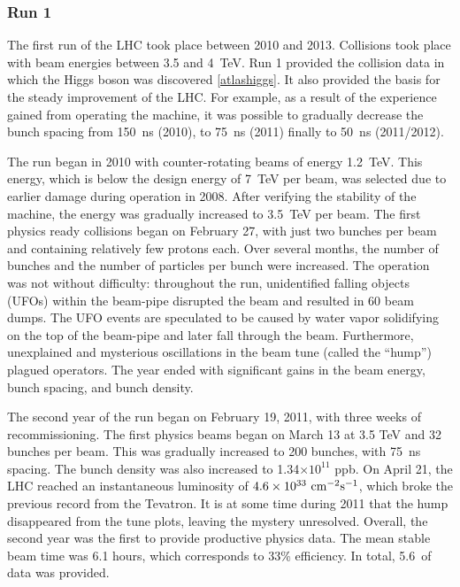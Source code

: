 \newpage

\subsubsection{Run 1}

The first run of the LHC took place between 2010 and 2013.
Collisions took place with beam energies between 3.5 and 4~TeV.\cite{lhcRun1}
Run 1 provided the collision data in which the Higgs boson was discovered \ref{atlashiggs}.
It also provided the basis for the steady improvement of the LHC.
For example, as a result of the experience gained from operating the machine, it was possible to gradually decrease the bunch spacing from 150~ns (2010), to 75~ns (2011) finally to 50~ns (2011/2012). \cite{lhcRun1}

The run began in 2010 with counter-rotating beams of energy 1.2~TeV.
This energy, which is below the design energy of 7~TeV per beam, was selected due to earlier damage during operation in 2008.
After verifying the stability of the machine, the energy was gradually increased to 3.5~TeV per beam.
The first physics ready collisions began on February 27, with just two bunches per beam and containing relatively few protons each.
Over several months, the number of bunches and the number of particles per bunch were increased.
The operation was not without difficulty: throughout the run, unidentified falling objects (UFOs) within the beam-pipe disrupted the beam and resulted in 60 beam dumps.
The UFO events are speculated to be caused by water vapor solidifying on the top of the beam-pipe and later fall through the beam.
Furthermore, unexplained and mysterious oscillations in the beam tune (called the ``hump'') plagued operators. \cite{lhcRun1}
The year ended with significant gains in the beam energy, bunch spacing, and bunch density.

The second year of the run began on February 19, 2011, with three weeks of recommissioning.
The first physics beams began on March 13 at 3.5 TeV and 32 bunches per beam.
This was gradually increased to 200 bunches, with 75~ns spacing.
The bunch density was also increased to 1.34$\times10^{11}$ ppb.
On April 21, the LHC reached an instantaneous luminosity of $4.6\times10^{33}~\text{cm}^{-2}\text{s}^{-1}$, which broke the previous record from the Tevatron.
It is at some time during 2011 that the hump disappeared from the tune plots, leaving the mystery unresolved.
Overall, the second year was the first to provide productive physics data. The mean stable beam time was 6.1 hours, which corresponds to 33\% efficiency.
In total, 5.6~\fb of data was provided. \cite{lhcRun1}


